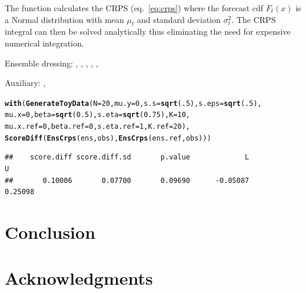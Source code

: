 \documentclass[article]{jss}\usepackage{graphicx, color}
\makeatletter
\newcommand{\hlfunctioncall}[1]{\textcolor[rgb]{0,0.501960784313725,0.752941176470588}{\textbf{#1}}}%
\newenvironment{kframe}{%
 \def\at@end@of@kframe{}%
 \ifinner\ifhmode%
  \def\at@end@of@kframe{\end{minipage}}%
  \begin{minipage}{\columnwidth}%
 \fi\fi%
 \def\FrameCommand##1{\hskip\@totalleftmargin \hskip-\fboxsep
 \colorbox{shadecolor}{##1}\hskip-\fboxsep
     \hskip-\linewidth \hskip-\@totalleftmargin \hskip\columnwidth}%
 \MakeFramed {\advance\hsize-\width
   \@totalleftmargin\z@ \linewidth\hsize
   \@setminipage}}%
 {\par\unskip\endMakeFramed%
 \at@end@of@kframe}
\newenvironment{knitrout}{}{} %
\makeatother
\begin{document}
The function  calculates the CRPS (eq.~\ref{eq:crps}) where the forecast cdf $F_t(x)$ is a Normal distribution with mean $\mu_t$ and standard deviation $\sigma^2_t$.
The CRPS integral can then be solved analytically \citep{gneiting2005calibrated} thus eliminating the need for expensive numerical integration.


Ensemble dressing: , , , , , 

Auxiliary: , 

\begin{knitrout}
\color{fgcolor}\begin{kframe}
\begin{alltt}
\hlfunctioncall{with}(\hlfunctioncall{GenerateToyData}(N=20, mu.y=0, s.s=\hlfunctioncall{sqrt}(.5), s.eps=\hlfunctioncall{sqrt}(.5), 
                     mu.x=0, beta=\hlfunctioncall{sqrt}(0.5), s.eta=\hlfunctioncall{sqrt}(0.75), K=10, 
                     mu.x.ref=0, beta.ref=0, s.eta.ref=1, K.ref=20), 
     \hlfunctioncall{ScoreDiff}(\hlfunctioncall{EnsCrps}(ens, obs), \hlfunctioncall{EnsCrps}(ens.ref, obs)))
\end{alltt}
\begin{verbatim}
##    score.diff score.diff.sd       p.value             L             U 
##       0.10006       0.07700       0.09690      -0.05087       0.25098
\end{verbatim}
\end{kframe}
\end{knitrout}






\section{Conclusion}

\section*{Acknowledgments}



\end{document}
